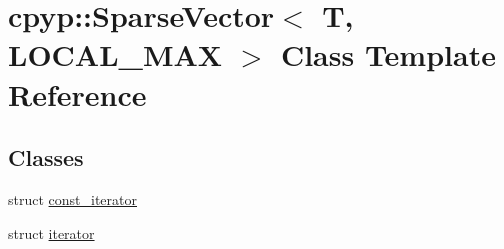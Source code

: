 \hypertarget{classcpyp_1_1_sparse_vector}{}\section{cpyp\+:\+:Sparse\+Vector$<$ T, L\+O\+C\+A\+L\+\_\+\+M\+AX $>$ Class Template Reference}
\label{classcpyp_1_1_sparse_vector}
\subsection*{Classes}
\begin{DoxyCompactItemize}
\item 
struct \mbox{\hyperlink{structcpyp_1_1_sparse_vector_1_1const__iterator}{const\+\_\+iterator}}
\item 
struct \mbox{\hyperlink{structcpyp_1_1_sparse_vector_1_1iterator}{iterator}}
\end{DoxyCompactItemize}
